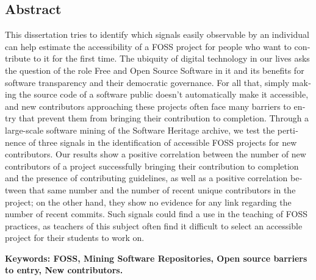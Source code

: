 \begin{otherlanguage}{english}
    \section*{Abstract}

    This dissertation tries to identify which signals easily observable by an individual can help estimate the
    accessibility of a FOSS project for people who want to contribute to it for the first time. The ubiquity
    of digital technology in our lives asks the question of the role Free and Open Source Software in it and
    its benefits for software transparency and their democratic governance. For all that, simply making the
    source code of a software public doesn't automatically make it accessible, and new contributors
    approaching these projects often face many barriers to entry that prevent them from bringing their
    contribution to completion. Through a large-scale software mining of the Software Heritage archive, we
    test the pertinence of three signals in the identification of accessible FOSS projects for new
    contributors. Our results show a positive correlation between the number of new contributors of a project
    successfully bringing their contribution to completion and the presence of contributing guidelines, as
    well as a positive correlation between that same number and the number of recent unique contributors in
    the project; on the other hand, they show no evidence for any link regarding the number of recent commits.
    Such signals could find a use in the teaching of FOSS practices, as teachers of this subject often find it
    difficult to select an accessible project for their students to work on.

    \textbf{Keywords: FOSS, Mining Software Repositories, Open source barriers to entry, New contributors.}
\end{otherlanguage}
